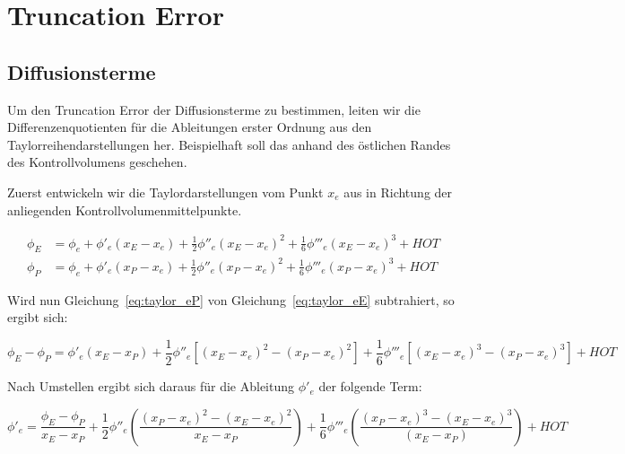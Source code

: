 \documentclass[11pt, ngerman,colorback,accentcolor=tud2d]{tudreport}
\begin{document}
\newcommand{\pder}[2][]{\frac{\partial#1}{\partial#2}}
\newcommand{\pderf}[1]{\frac{\partial f}{\partial#1}}
\newcommand{\pderfs}[1]{\frac{\partial^2 f}{\partial#1}}



\chapter{Truncation Error}
\label{cha:Truncation_Error}
\section{Diffusionsterme}
\label{sec:Diffusionsterme}


Um den Truncation Error der Diffusionsterme zu bestimmen, leiten wir die Differenzenquotienten
für die Ableitungen erster Ordnung aus den Taylorreihendarstellungen her. Beispielhaft
soll das anhand des östlichen Randes des Kontrollvolumens geschehen.

Zuerst entwickeln wir die Taylordarstellungen vom Punkt $x_e$ aus in Richtung der anliegenden
Kontrollvolumenmittelpunkte.

\begin{align}
  \phi_E &= \phi_e + \phi'_e(x_E-x_e)+\frac{1}{2}\phi''_e(x_E-x_e)^2
  +\frac{1}{6}\phi'''_e(x_E-x_e)^3+HOT
  \label{eq:taylor_eE}\\
  \phi_P &= \phi_e + \phi'_e(x_P-x_e)+\frac{1}{2}\phi''_e(x_P-x_e)^2
  +\frac{1}{6}\phi'''_e(x_P-x_e)^3+HOT
  \label{eq:taylor_eP}
\end{align}

Wird nun Gleichung~\eqref{eq:taylor_eP} von Gleichung~\eqref{eq:taylor_eE} subtrahiert, 
so ergibt sich:

\begin{equation*}
  \phi_E-\phi_P=\phi'_e(x_E-x_P)+
  \frac{1}{2}\phi''_e\left[{{(x_E-x_e)}^2-{(x_P-x_e)}^2}\right]+
  \frac{1}{6}\phi'''_e\left[{{(x_E-x_e)}^3-{(x_P-x_e)}^3}\right]+HOT
\end{equation*}

Nach Umstellen ergibt sich daraus für die Ableitung $\phi'_e$ der folgende Term:

\begin{equation}
  \phi'_e = \frac{\phi_E-\phi_P}{x_E-x_P}+\frac{1}{2}\phi''_e
\left({\frac{{(x_P-x_e)}^2-{(x_E-x_e)}^2}{x_E-x_P}}\right)+
\frac{1}{6} \phi'''_e \left({\frac{{(x_P-x_e)}^3-{(x_E-x_e)}^3}{(x_E-x_P)}}\right)+HOT
\end{equation}
\end{document}
